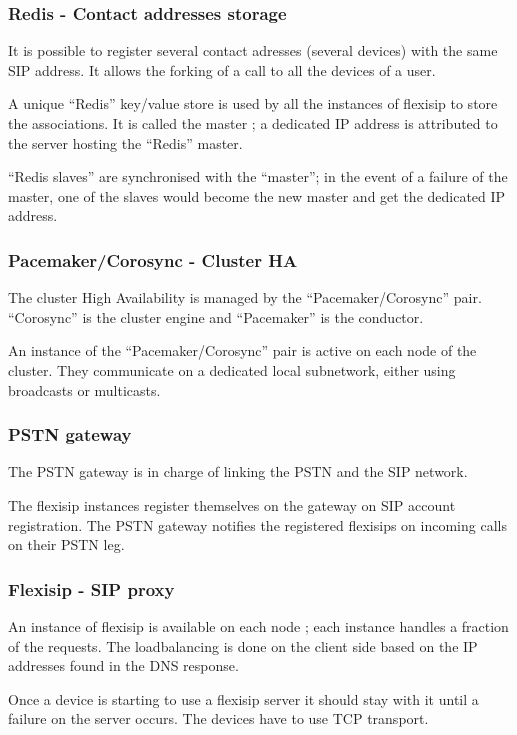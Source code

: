\documentclass[a4paper,10pt]{article}
\begin{document}
\subsubsection{Redis - Contact addresses storage}
It is possible to register several contact adresses (several devices) with the same SIP address.
It allows the forking of a call to all the devices of a user.

A unique ``Redis'' key/value store is used by all the instances of flexisip to store the associations.
It is called the master ; a dedicated IP address is attributed to the server hosting the ``Redis'' master.

``Redis slaves'' are synchronised with the ``master''; in the event of a failure of the master,
one of the slaves would become the new master and get the dedicated IP address.



\subsubsection{Pacemaker/Corosync - Cluster HA}
The cluster High Availability is managed by the ``Pacemaker/Corosync'' pair.
``Corosync'' is the cluster engine and ``Pacemaker'' is the conductor.

An instance of the ``Pacemaker/Corosync'' pair is active on each node of the cluster.
They communicate on a dedicated local subnetwork, either using broadcasts or multicasts.


\subsubsection{PSTN gateway}
The PSTN gateway is in charge of linking the PSTN and the SIP network.

The flexisip instances register themselves on the gateway on SIP account registration.
The PSTN gateway notifies the registered flexisips on incoming calls on their PSTN leg.


\subsubsection{Flexisip - SIP proxy}
An instance of flexisip is available on each node ; each instance handles a fraction of the requests.
The loadbalancing is done on the client side based on the IP addresses found in the DNS response.

Once a device is starting to use a flexisip server it should stay with it until a failure on the server occurs.
The devices have to use TCP transport.
\end{document}
